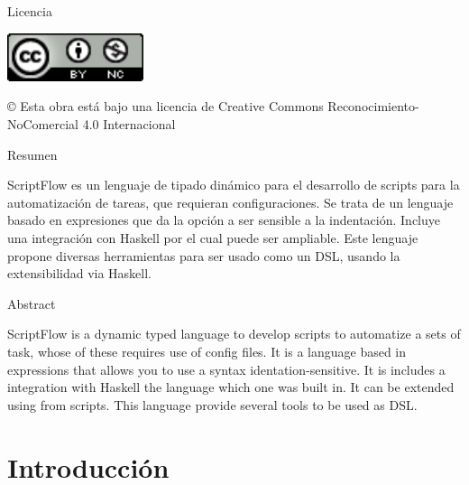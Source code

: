 \documentclass[11pt]{article}
\begin{document}
\newpage
\begin{flushleft}
  {\huge  Licencia }\\[2ex]
\end{flushleft}

\begin{center}
  \includegraphics[width=40mm]{license.png}\\[4ex]
\end{center}
© Esta obra está bajo una licencia de Creative Commons Reconocimiento-NoComercial 4.0 Internacional

\newpage
\begin{center}
  {\huge  Resumen }\\[2ex]
\end{center}

{\fontsize{14}{11}\selectfont
   ScriptFlow es un lenguaje de tipado dinámico para el desarrollo de scripts para la automatización de tareas, que requieran configuraciones.
   Se trata de un lenguaje basado en expresiones que da la opción a ser sensible a la indentación. Incluye una integración con Haskell por el
   cual puede ser ampliable.
   Este lenguaje propone diversas herramientas para ser usado como un DSL, usando la extensibilidad via Haskell.
}

\newpage
\begin{center}
  {\huge  Abstract }\\[2ex]
\end{center}

{\fontsize{14}{11}\selectfont
   ScriptFlow is a dynamic typed language to develop scripts to automatize a sets of task, whose of these requires use of config files.
   It is a language based in expressions that allows you to use a syntax identation-sensitive. It is includes a integration with Haskell the language
   which one was built in. It can be extended using from scripts.
   This language provide several tools to be used as DSL.
}

\newpage

\renewcommand{\contentsname}{Índice general}

\tableofcontents

\newpage


\section{Introducción}
\label{sec:org650b5e2}
\end{document}
